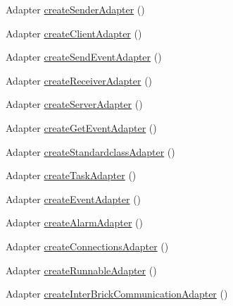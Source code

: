 \begin{DoxyCompactItemize}
\item 
Adapter \hyperlink{classshootingmachineemfmodel_1_1util_1_1_shootingmachineemfmodel_adapter_factory_ae13a465d4447230da8022e4a0e77781d}{create\-Sender\-Adapter} ()
\item 
Adapter \hyperlink{classshootingmachineemfmodel_1_1util_1_1_shootingmachineemfmodel_adapter_factory_a3f4aec9aa22248e87bb9a8065a110623}{create\-Client\-Adapter} ()
\item 
Adapter \hyperlink{classshootingmachineemfmodel_1_1util_1_1_shootingmachineemfmodel_adapter_factory_a56c2acc0993c1478d82be42ee04cfc2b}{create\-Send\-Event\-Adapter} ()
\item 
Adapter \hyperlink{classshootingmachineemfmodel_1_1util_1_1_shootingmachineemfmodel_adapter_factory_af1fbbadf5c5a5e092472306f0f230eb8}{create\-Receiver\-Adapter} ()
\item 
Adapter \hyperlink{classshootingmachineemfmodel_1_1util_1_1_shootingmachineemfmodel_adapter_factory_a9b4498f614148005d28fdb354a0eccfe}{create\-Server\-Adapter} ()
\item 
Adapter \hyperlink{classshootingmachineemfmodel_1_1util_1_1_shootingmachineemfmodel_adapter_factory_aa8f666651c60fee831e05fef3de35439}{create\-Get\-Event\-Adapter} ()
\item 
Adapter \hyperlink{classshootingmachineemfmodel_1_1util_1_1_shootingmachineemfmodel_adapter_factory_a6855b30e795261e99b9eceeafb64ae66}{create\-Standardclass\-Adapter} ()
\item 
Adapter \hyperlink{classshootingmachineemfmodel_1_1util_1_1_shootingmachineemfmodel_adapter_factory_ade245b67cf6e05c66d5925372ee7acc7}{create\-Task\-Adapter} ()
\item 
Adapter \hyperlink{classshootingmachineemfmodel_1_1util_1_1_shootingmachineemfmodel_adapter_factory_a5757f61a66a6d08b82c0ff268ac797eb}{create\-Event\-Adapter} ()
\item 
Adapter \hyperlink{classshootingmachineemfmodel_1_1util_1_1_shootingmachineemfmodel_adapter_factory_ad460152c07741140933086906b2c038b}{create\-Alarm\-Adapter} ()
\item 
Adapter \hyperlink{classshootingmachineemfmodel_1_1util_1_1_shootingmachineemfmodel_adapter_factory_a7c38ed5fbc1d4b632d40ce6442f91223}{create\-Connections\-Adapter} ()
\item 
Adapter \hyperlink{classshootingmachineemfmodel_1_1util_1_1_shootingmachineemfmodel_adapter_factory_a23573b8280e6922699d60cedaaa79ba0}{create\-Runnable\-Adapter} ()
\item 
Adapter \hyperlink{classshootingmachineemfmodel_1_1util_1_1_shootingmachineemfmodel_adapter_factory_a3bb927290e750f4f349138e9df052a60}{create\-Inter\-Brick\-Communication\-Adapter} ()

\end{DoxyCompactItemize}
